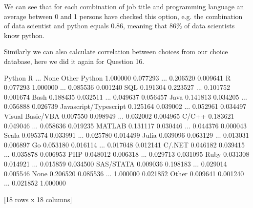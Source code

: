 \documentclass[letterpaper,10pt,english]{jupyterBook}
\begin{document}
\sphinxAtStartPar
We can see that for each combination of job title and programming language an average between 0 and 1 persons have checked this option, e.g. the combination of data scientist and python equals 0.86, meaning that 86\% of data scientists know python.

\sphinxAtStartPar
Similarly we can also calculate correlation between choices from our choice database, here we did it again for Question 16.

\begin{sphinxVerbatim}[commandchars=\\\{\}]
\PYG{p}{[}\PYG{p}{]}
\end{sphinxVerbatim}

\begin{sphinxVerbatim}[commandchars=\\\{\}]
                         Python         R  ...      None     Other
Python                 1.000000  0.077293  ... \PYGZhy{}0.206520  0.009641
R                      0.077293  1.000000  ... \PYGZhy{}0.085536 \PYGZhy{}0.001240
SQL                    0.191304  0.223527  ... \PYGZhy{}0.101752  0.001674
Bash                   0.188435  0.032511  ... \PYGZhy{}0.049637  0.056457
Java                   0.141813 \PYGZhy{}0.034205  ... \PYGZhy{}0.056888  0.026739
Javascript/Typescript  0.125164 \PYGZhy{}0.039002  ... \PYGZhy{}0.052961  0.034497
Visual Basic/VBA       0.007550  0.098949  ... \PYGZhy{}0.032002 \PYGZhy{}0.004965
C/C++                  0.183621 \PYGZhy{}0.049046  ... \PYGZhy{}0.058636  0.019235
MATLAB                 0.131117  0.030446  ... \PYGZhy{}0.044376 \PYGZhy{}0.000043
Scala                  0.095374  0.033991  ... \PYGZhy{}0.025780  0.014499
Julia                  0.039096  0.063129  ... \PYGZhy{}0.013031  0.006897
Go                     0.053180 \PYGZhy{}0.016114  ... \PYGZhy{}0.017048  0.012141
C\PYGZsh{}/.NET                0.046182 \PYGZhy{}0.039415  ... \PYGZhy{}0.035878  0.006953
PHP                    0.048012 \PYGZhy{}0.006318  ... \PYGZhy{}0.029713  0.031095
Ruby                   0.031308  0.014921  ... \PYGZhy{}0.015859  0.034500
SAS/STATA             \PYGZhy{}0.009036  0.198183  ... \PYGZhy{}0.029014 \PYGZhy{}0.005546
None                  \PYGZhy{}0.206520 \PYGZhy{}0.085536  ...  1.000000 \PYGZhy{}0.021852
Other                  0.009641 \PYGZhy{}0.001240  ... \PYGZhy{}0.021852  1.000000

[18 rows x 18 columns]
\end{sphinxVerbatim}
\end{document}

